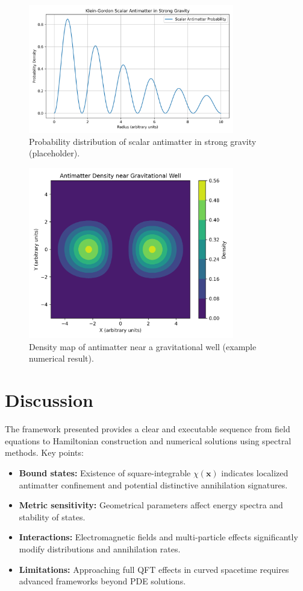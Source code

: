 \documentclass[12pt,a4paper]{article}
\begin{document}
\begin{figure}[H]
\centering
\includegraphics[width=0.8\textwidth]{kg_curved.png}
\caption{Probability distribution of scalar antimatter in strong gravity (placeholder).}
\label{fig:kg}
\end{figure}

\begin{figure}[H]
\centering
\includegraphics[width=0.8\textwidth]{antimatter_density.png}
\caption{Density map of antimatter near a gravitational well (example numerical result).}
\label{fig:dens}
\end{figure}

\section{Discussion }
The framework presented provides a clear and executable sequence from field equations to Hamiltonian construction and numerical solutions using spectral methods. Key points:
\begin{itemize}
  \item \textbf{Bound states:} Existence of square-integrable \(\chi(\mathbf{x})\) indicates localized antimatter confinement and potential distinctive annihilation signatures.
  \item \textbf{Metric sensitivity:} Geometrical parameters affect energy spectra and stability of states.
  \item \textbf{Interactions:} Electromagnetic fields and multi-particle effects significantly modify distributions and annihilation rates.
  \item \textbf{Limitations:} Approaching full QFT effects in curved spacetime requires advanced frameworks beyond PDE solutions.
\end{itemize}
\end{document}
